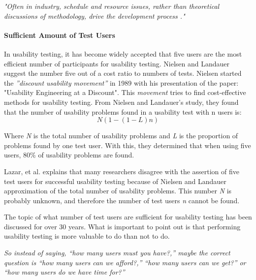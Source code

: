 \textit{"Often in industry, schedule and resource issues, rather than theoretical discussions of methodology, drive the development process \cite{wixon2003evaluating}."}

\paragraph{Sufficient Amount of Test Users}
\label{ssub:Sufficient Amount of Test Users}

In usability testing, it has become widely accepted that five users are the most efficient number of participants for usability testing.  Nielsen and Landauer suggest the number five out of a cost ratio to numbers of tests\cite{nielsen1993mathematical}. Nielsen started the \textit{''discount usability movement''} in 1989 with his presentation of the paper: "Usability Engineering at a Discount"\cite{experienceDiscountUsability20}. This \textit{movement} tries to find cost-effective methods for usability testing. 
From Nielsen and Landauer's study, they found that the number of usability problems found in a usability test with n users is:
\[ N (1-(1- L ) n ) \]

Where \textit{N} is the total number of usability problems and  \textit{L} is the proportion of problems found by one test user. With this, they determined that when using five users, 80\% of usability problems are found.

Lazar, et al. explains that many researchers disagree with the assertion of five test users for successful usability testing because of Nielsen and Landauer approximation of the total number of usability problems\cite[Chapter~10.5.3]{lazar2017research}. This number \textit{N} is probably unknown, and therefore the number of test users \textit{n} cannot be found.

The topic of what number of test users are sufficient for usability testing has been discussed for over 30 years. What is important to point out is that performing usability testing is more valuable to do than not to do. 


\textit{
So instead of saying, “how many users must you have?,” maybe the correct question is “how many users can we afford?,” “how many users can we get?” or “how many users do we have time for?”
} \cite{lazar2017research} 








